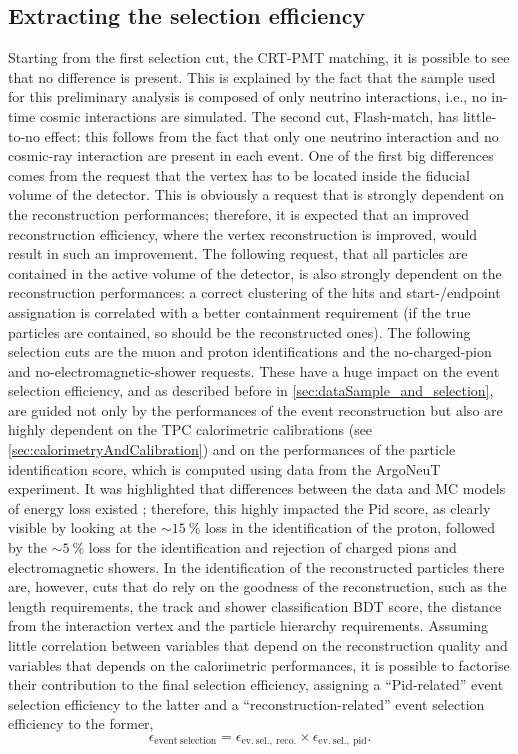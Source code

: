 \subsection{Extracting the selection efficiency} \label{sec:efficiencyPidExtraction}

Starting from the first selection cut, the CRT-PMT matching, it is possible to see that no difference is present. This is explained by the fact that the sample used for this preliminary analysis is composed of only neutrino interactions, i.e., no in-time cosmic interactions are simulated. The second cut, Flash-match, has little-to-no effect: this follows from the fact that only one neutrino interaction and no cosmic-ray interaction are present in each event. One of the first big differences comes from the request that the vertex has to be located inside the fiducial volume of the detector. This is obviously a request that is strongly dependent on the reconstruction performances; therefore, it is expected that an improved reconstruction efficiency, where the vertex reconstruction is improved, would result in such an improvement. The following request, that all particles are contained in the active volume of the detector, is also strongly dependent on the reconstruction performances: a correct clustering of the hits and start-/endpoint assignation is correlated with a better containment requirement (if the true particles are contained, so should be the reconstructed ones). The following selection cuts are the muon and proton identifications and the no-charged-pion and no-electromagnetic-shower requests. These have a huge impact on the event selection efficiency, and as described before in \autoref{sec:dataSample_and_selection}, are guided not only by the performances of the event reconstruction but also are highly dependent on the TPC calorimetric calibrations (see \autoref{sec:calorimetryAndCalibration}) and on the performances of the particle identification score, which is computed using data from the ArgoNeuT experiment. It was highlighted that differences between the data and MC models of energy loss existed \cite{Sommaggio:2025_updatesdEdxStudies}; therefore, this highly impacted the Pid score, as clearly visible by looking at the ${\sim}\SI{15}{\percent}$ loss in the identification of the proton, followed by the ${\sim}\SI{5}{\percent}$ loss for the identification and rejection of charged pions and electromagnetic showers. In the identification of the reconstructed particles there are, however, cuts that do rely on the goodness of the reconstruction, such as the length requirements, the track and shower classification BDT score, the distance from the interaction vertex and the particle hierarchy requirements. Assuming little correlation between variables that depend on the reconstruction quality and variables that depends on the calorimetric performances, it is possible to factorise their contribution to the final selection efficiency, assigning a ``Pid-related'' event selection efficiency to the latter and a ``reconstruction-related'' event selection efficiency to the former, \begin{equation}
    \epsilon_\mathrm{event\ selection} = \epsilon_\mathrm{ev.\ sel.,\ reco.} \times \epsilon_\mathrm{ev.\ sel.,\ pid}.
\end{equation} 

